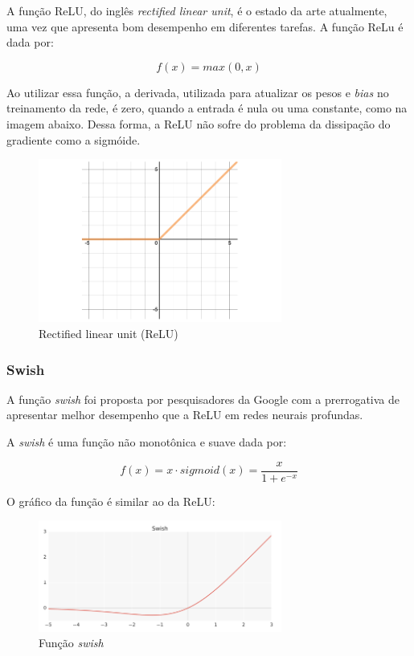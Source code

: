 A função ReLU, do inglês \textit{rectified linear unit}, é o 
estado da arte atualmente, uma vez que apresenta bom desempenho 
em diferentes tarefas. \cite{dl-oreilly} A função ReLu é dada por:

\begin{equation}
  f(x) = max(0,x)
\end{equation}

Ao utilizar essa função, a derivada, utilizada para atualizar
os pesos e \textit{bias} no treinamento da rede, é zero, quando 
a entrada é nula ou uma constante, como na imagem abaixo. Dessa
forma, a ReLU não sofre do problema da dissipação do gradiente como
a sigmóide.

\begin{figure}[H] 
  \includegraphics[width= 8cm]{../figuras/relu.png}
  \caption{Rectified linear unit (ReLU) \cite{dl-oreilly}}
  \label{fig:relu}
\end{figure}

\subsubsection{Swish}

A função \textit{swish} foi proposta por pesquisadores da 
Google com a prerrogativa de apresentar melhor desempenho 
que a ReLU em redes neurais profundas. \cite{swish}

A \textit{swish} é uma função não monotônica e suave 
dada por:

\begin{equation}
  f(x) = x \cdot sigmoid(x) = \frac{x}{1+e^{-x}}
\end{equation}


O gráfico da função é similar ao da ReLU:

\begin{figure}[H] 
  \includegraphics[width= 8cm]{../figuras/swish.png}
  \caption{Função \textit{swish} \cite{swish}}
  \label{fig:swish}
\end{figure}

